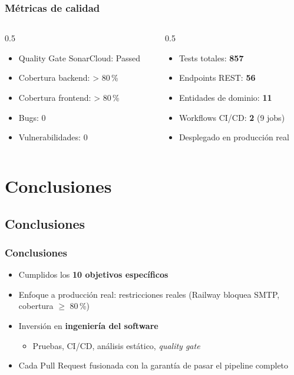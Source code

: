 \documentclass[xcolor=svgnames,aspectratio=169]{beamer}
\begin{document}
\begin{frame}
  \frametitle{M\'etricas de calidad}
  \begin{columns}[T]
    \begin{column}{0.5\textwidth}
      \begin{itemize}
        \item Quality Gate SonarCloud: \alert{Passed} \smallskip
        \item Cobertura backend: \alert{> 80\,\%} \smallskip
        \item Cobertura frontend: \alert{> 80\,\%} \smallskip
        \item Bugs: \alert{0} \smallskip
        \item Vulnerabilidades: \alert{0}
      \end{itemize}
    \end{column}
    \begin{column}{0.5\textwidth}
      \begin{itemize}
        \item Tests totales: \textbf{857} \smallskip
        \item Endpoints REST: \textbf{56} \smallskip
        \item Entidades de dominio: \textbf{11} \smallskip
        \item Workflows CI/CD: \textbf{2} (9 jobs) \smallskip
        \item Desplegado en \alert{producci\'on real}
      \end{itemize}
    \end{column}
  \end{columns}
\end{frame}

\section{Conclusiones}

\subsection{Conclusiones}
\begin{frame}
  \frametitle{Conclusiones}
  \begin{itemize}
    \item Cumplidos los \textbf{10 objetivos espec\'ificos} \medskip
    \item Enfoque a \alert{producci\'on real}: restricciones reales (Railway bloquea SMTP, cobertura $\geq$ 80\,\%) \medskip
    \item Inversi\'on en \textbf{ingenier\'ia del software} \smallskip
    \begin{itemize}
      \item Pruebas, CI/CD, an\'alisis est\'atico, \emph{quality gate}
    \end{itemize} \medskip
    \item Cada Pull Request fusionada con la garant\'ia de pasar el pipeline completo
  \end{itemize}
\end{frame}
\end{document}
